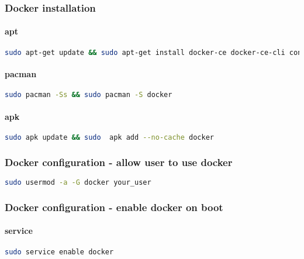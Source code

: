 \subsubsection{Docker installation}

\paragraph{apt}
\begin{flushleft}
\begin{lstlisting}[language=bash,label={lst:apt-docker}]
sudo apt-get update && sudo apt-get install docker-ce docker-ce-cli containerd.io\end{lstlisting}
\end{flushleft}

\paragraph{pacman}
\begin{flushleft}
\begin{lstlisting}[language=bash,label={lst:pacman-docker}]
sudo pacman -Ss && sudo pacman -S docker\end{lstlisting}
\end{flushleft}

\paragraph{apk}
\begin{flushleft}
\begin{lstlisting}[language=bash,label={lst:apk-docker}]
sudo apk update && sudo  apk add --no-cache docker\end{lstlisting}
\end{flushleft}

\subsubsection{Docker configuration - allow user to use docker}
\begin{lstlisting}[language=bash,label={lst:add-group-docker}]
sudo usermod -a -G docker your_user\end{lstlisting}

\subsubsection{Docker configuration - enable docker on boot}
\paragraph{service}
\begin{flushleft}
\begin{lstlisting}[language=bash,label={lst:service-docker}]
sudo service enable docker\end{lstlisting}
\end{flushleft}

